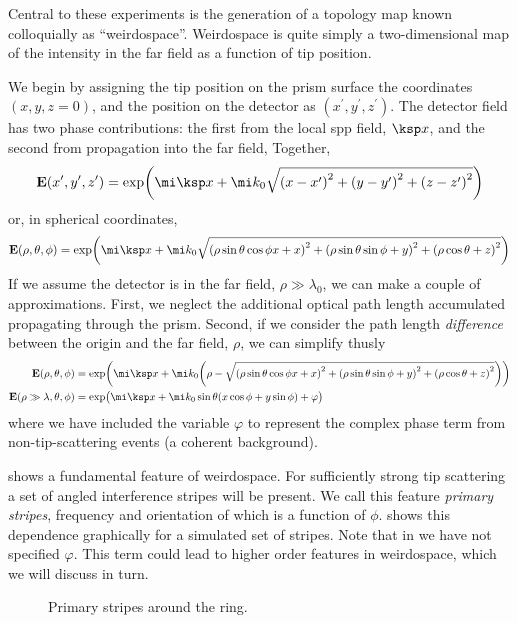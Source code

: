 Central to these experiments is the generation of a topology map known
colloquially as ``weirdospace''.  Weirdospace is quite simply
a two-dimensional map of the intensity in the far field as a function of tip
position.

We begin by assigning the tip position on the prism surface the coordinates
$(x,y,z=0)$, and the position on the detector as
$(x^\prime,y^\prime,z^\prime)$.  The detector field has two phase
contributions: the first from the local \gls{spp} field, $\ksp x$, and the second
from propagation into the far field, Together,
\begin{equation}
\mathbf{E}(x^\prime,y^\prime,z^\prime) = \exp\!{\left( \mi\ksp x + \mi k_0\sqrt{{(x-x^\prime)}^2+{(y-y^\prime)}^2+ {(z-z^\prime)}^2 } \right)}
\end{equation}
or, in spherical coordinates,
\begin{equation}
\mathbf{E}(\rho,\theta,\phi) = \exp\!{\left( \mi\ksp x + %
\mi k_0\sqrt{{(\rho\sin\theta\cos\phi x+x)}^2+{(\rho\sin\theta\sin\phi+y)}^2+{(\rho\cos\theta+z)}^2 } \right)}
\label{eqn:dingusthusly}
\end{equation}
If we assume the detector is in the far field, $\rho\gg\lambda_0$, we can
make a couple of approximations.  First, we neglect the additional optical
path length accumulated propagating through the prism.  Second, if we
consider the path length \textit{difference} between the origin and the far field,
$\rho$, we can simplify  thusly
\begin{align}
				\mathbf{E}(\rho,\theta,\phi) &= \exp\!{\left( \mi\ksp x + %
				\mi k_0{\left(\rho-\sqrt{{(\rho\sin\theta\cos\phi x+x)}^2+{(\rho\sin\theta\sin\phi+y)}^2+{(\rho\cos\theta+z)}^2
				}\right)} \right)}\\
				\mathbf{E}(\rho\gg\lambda,\theta,\phi) &= \exp\!{\big( \mi \ksp x
				+ \mi k_0 \sin\theta {\left(x\cos\phi+y\sin\phi\right)}
				+ \varphi\big)}
	\label{eqn:primarystripes}
\end{align}
where we have included the variable $\varphi$ to represent the complex phase term
from non-tip-scattering events (a coherent background).

 shows a fundamental feature of weirdospace.
For sufficiently strong tip scattering a set of angled interference stripes
will be present.  We call this feature \textit{primary stripes},
frequency and orientation of which is a function of $\phi$.
 shows this
dependence graphically for a simulated set of stripes.  Note that in
 we have not specified $\varphi$.  This term
could lead to higher order features in weirdospace, which we will discuss
in turn.
\begin{figure}
\centering
\caption{Primary stripes around the ring.}
\label{fig:primarystripes}
\end{figure}
